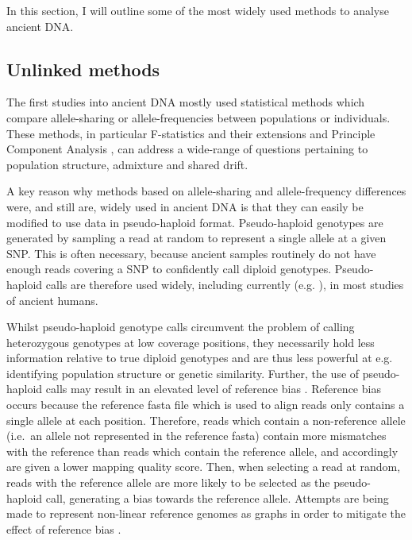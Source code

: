 In this section, I will outline some of the most widely used methods to analyse ancient DNA.

\subsection{Unlinked methods}

The first studies into ancient DNA mostly used statistical methods which compare allele-sharing or allele-frequencies between populations or individuals. These methods, in particular F-statistics and their extensions \cite{Green2010, Patterson2012, peter2016admixture, AssessingqpAdm} and Principle Component Analysis \cite{price2006principal}, can address a wide-range of questions pertaining to population structure, admixture and shared drift. 

A key reason why methods based on allele-sharing and allele-frequency differences were, and still are, widely used in ancient DNA is that they can easily be modified to use data in pseudo-haploid format. Pseudo-haploid genotypes are generated by sampling a read at random to represent a single allele at a given SNP. This is often necessary, because ancient samples routinely do not have enough reads covering a SNP to confidently call diploid genotypes. Pseudo-haploid calls are therefore used widely, including currently (e.g. \cite{sirak2021social}), in most studies of ancient humans. 

Whilst pseudo-haploid genotype calls circumvent the problem of calling heterozygous genotypes at low coverage positions, they necessarily hold less information relative to true diploid genotypes and are thus less powerful at e.g. identifying population structure or genetic similarity. Further, the use of pseudo-haploid calls may result in an elevated level of reference bias \cite{GuntherRefBias, Martiniano2017, martiniano2020removing}. Reference bias occurs because the reference fasta file which is used to align reads only contains a single allele at each position. Therefore, reads which contain a non-reference allele (i.e.\ an allele not represented in the reference fasta) contain more mismatches with the reference than reads which contain the reference allele, and accordingly are given a lower mapping quality score. Then, when selecting a read at random, reads with the reference allele are more likely to be selected as the pseudo-haploid call, generating a bias towards the reference allele. Attempts are being made to represent non-linear reference genomes as graphs in order to mitigate the effect of reference bias \cite{Garrison2018, martiniano2020removing}.

